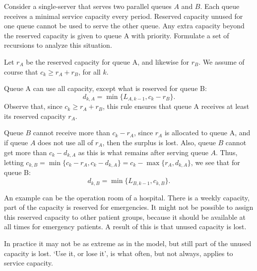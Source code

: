 \begin{exercise} 
 Consider a single-server that serves two parallel queues $A$ and $B$.
 Each queue receives a minimal service capacity every period.
 Reserved capacity unused for one queue cannot be used to serve the other queue.
 Any extra capacity beyond the reserved capacity is given to queue A with priority.
 Formulate a set of recursions to analyze this situation.

 Let $r_A$ be the reserved capacity for queue A, and likewise for
 $r_B$. We assume of course that $c_k\geq r_A + r_B$, for all $k$.
\begin{solution} Queue A can use all capacity, except what is
 reserved for queue B:
\begin{equation*}
 d_{k,A} = \min\{L_{A, k-1}, c_k - r_B\}.
\end{equation*}
Observe that, since $c_k \geq r_A + r_B$, this rule ensures that queue
A receives at least its reserved capacity $r_A$.

Queue $B$ cannot receive more than $c_k-r_A$, since $r_A$ is allocated
to queue A, and if queue $A$ does not use all of $r_A$, then the
surplus is lost. Also, queue $B$ cannot get more than $c_k - d_{k,A}$
as this is what remains after serving queue $A$. Thus, letting
$c_{k,B} = \min\{c_k-r_A, c_k-d_{k,A}\} = c_k - \max\{r_A, d_{k,A}\}$,
we see that for queue B:
\begin{equation*}
 d_{k,B} = \min\{L_{B, k-1}, c_{k,B}\}.
\end{equation*}

An example can be the operation room of a hospital.
There is a weekly capacity, part of the capacity is reserved for emergencies.
It might not be possible to assign this reserved capacity to other patient groups, because it should be available at all times for emergency patients.
A result of this is that unused capacity is lost.

In practice it may not be as extreme as in the model, but still part
of the unused capacity is lost. `Use it, or lose it', is what often,
but not always, applies to service capacity.
\end{solution}
\end{exercise}




